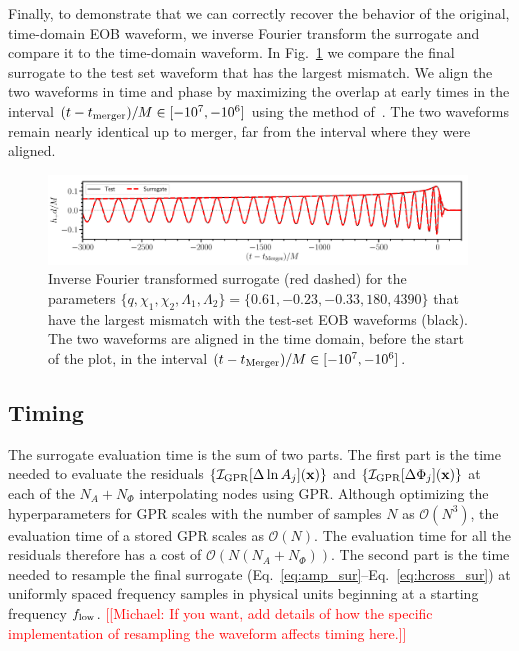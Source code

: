 \documentclass[prd,aps,letter,twocolumn,floatfix,notitlepage,nofootinbib]{revtex4-1}
\def\bx{\mathbf{x}}
\newcommand{\MP}[1]{{\textcolor{blue}{\texttt{MP: #1}} }}
\newcommand{\red}[1]{\textcolor{red}{#1}}
\begin{document}
Finally, to demonstrate that we can correctly recover the behavior of the original, time-domain EOB waveform, we inverse Fourier transform the surrogate and compare it to the time-domain waveform. In Fig.~\ref{fig:maxmismatchtd} we compare the final surrogate to the test set waveform that has the largest mismatch. We align the two waveforms in time and phase by maximizing the overlap at early times in the interval $(t-t_{\rm merger})/M \in [-10^7, -10^6]$ using the method of~\cite{ReadMarkakisShibata2009}. The two waveforms remain nearly identical up to merger, far from the interval where they were aligned.

\begin{figure}[htb]
\centering
\includegraphics[width=0.99\textwidth]{hmaxerror.pdf}
\caption{Inverse Fourier transformed surrogate (red dashed) for the parameters $\{q, \chi_1, \chi_2, \Lambda_1, \Lambda_2\} = \{0.61, -0.23, -0.33, 180, 4390\}$ that have the largest mismatch with the test-set EOB waveforms (black). The two waveforms are aligned in the time domain, before the start of the plot, in the interval $(t-t_{\rm Merger})/M \in [-10^7, -10^6]$.}
\label{fig:maxmismatchtd}
\end{figure}


\subsection{Timing}

The surrogate evaluation time is the sum of two parts. The first part is the time needed to evaluate the residuals $\{\mathcal{I}_{\rm GPR}[\Delta\ln A_j](\bx)\}$ and $\{\mathcal{I}_{\rm GPR}[\Delta\Phi_j](\bx)\}$ at each of the $N_A+N_\Phi$ interpolating nodes using GPR. Although optimizing the hyperparameters for GPR scales with the number of samples $N$ as $\mathcal{O}(N^3)$, the evaluation time of a stored GPR scales as $\mathcal{O}(N)$. The evaluation time for all the residuals therefore has a cost of $\mathcal{O}(N(N_A+N_\Phi))$. The second part is the time needed to resample the final surrogate (Eq.~\eqref{eq:amp_sur}--Eq.~\eqref{eq:hcross_sur}) at uniformly spaced frequency samples in physical units beginning at a starting frequency $f_{\rm low}$. \red{[[Michael: If you want, add details of how the specific implementation of resampling the waveform affects timing here.]]}
\end{document}
